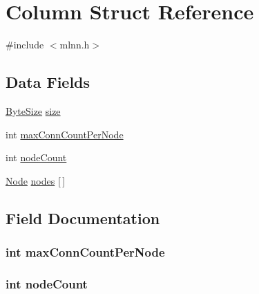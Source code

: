 \hypertarget{struct_column}{}\section{Column Struct Reference}
\label{struct_column}


{\ttfamily \#include $<$mlnn.\+h$>$}

\subsection*{Data Fields}
\begin{DoxyCompactItemize}
\item 
\hyperlink{mlnn_8h_a7a4b57eb083e961719b18441711d8ee5}{Byte\+Size} \hyperlink{struct_column_aab34baa6cb3e7bebfb7f4ba88a0ffbda}{size}
\item 
int \hyperlink{struct_column_a03be3b2a5b34355cd872903b5dd538b1}{max\+Conn\+Count\+Per\+Node}
\item 
int \hyperlink{struct_column_afa7148c5dbf788d1d6e0d8642c71f177}{node\+Count}
\item 
\hyperlink{struct_node}{Node} \hyperlink{struct_column_a90b8ac6daed74219624bcb8b60c2eae6}{nodes} \mbox{[}$\,$\mbox{]}
\end{DoxyCompactItemize}


\subsection{Field Documentation}
\hypertarget{struct_column_a03be3b2a5b34355cd872903b5dd538b1}{}
\subsubsection[{max\+Conn\+Count\+Per\+Node}]{\setlength{\rightskip}{0pt plus 5cm}int max\+Conn\+Count\+Per\+Node}\label{struct_column_a03be3b2a5b34355cd872903b5dd538b1}
\hypertarget{struct_column_afa7148c5dbf788d1d6e0d8642c71f177}{}
\subsubsection[{node\+Count}]{\setlength{\rightskip}{0pt plus 5cm}int node\+Count}\label{struct_column_afa7148c5dbf788d1d6e0d8642c71f177}
\hypertarget{struct_column_a90b8ac6daed74219624bcb8b60c2eae6}{}
